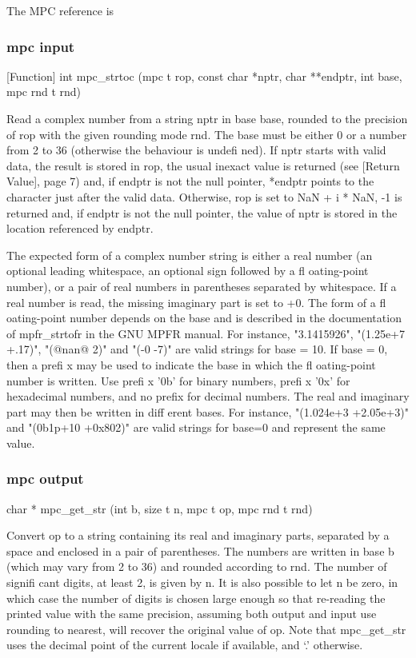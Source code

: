 The MPC reference is \cite{mpc_2012}

\lipsum[1]




\subsubsection{mpc input}
[Function] int mpc\_strtoc (mpc t rop, const char *nptr, char **endptr, int base,
mpc rnd t rnd)

Read a complex number from a string nptr in base base, rounded to the precision of rop
with the given rounding mode rnd. The base must be either 0 or a number from 2 to 36
(otherwise the behaviour is undefi ned). If nptr starts with valid data, the result is stored in
rop, the usual inexact value is returned (see [Return Value], page 7) and, if endptr is not the
null pointer, *endptr points to the character just after the valid data. Otherwise, rop is set
to NaN + i * NaN, -1 is returned and, if endptr is not the null pointer, the value of nptr is
stored in the location referenced by endptr.

The expected form of a complex number string is either a real number (an optional leading
whitespace, an optional sign followed by a fl oating-point number), or a pair of real numbers
in parentheses separated by whitespace. If a real number is read, the missing imaginary part
is set to +0. The form of a fl oating-point number depends on the base and is described in the
documentation of mpfr\_strtofr in the GNU MPFR manual. For instance, "3.1415926",
"(1.25e+7 +.17)", "(@nan@ 2)" and "(-0 -7)" are valid strings for base = 10. If base = 0,
then a prefi x may be used to indicate the base in which the fl oating-point number is written.
Use prefi x ’0b’ for binary numbers, prefi x ’0x’ for hexadecimal numbers, and no prefix for
decimal numbers. The real and imaginary part may then be written in diff erent bases. For
instance, "(1.024e+3 +2.05e+3)" and "(0b1p+10 +0x802)" are valid strings for base=0 and
represent the same value.



\subsubsection{mpc output}
char * mpc\_get\_str (int b, size t n, mpc t op, mpc rnd t rnd)

Convert op to a string containing its real and imaginary parts, separated by a space and
enclosed in a pair of parentheses. The numbers are written in base b (which may vary from 2
to 36) and rounded according to rnd. The number of signifi cant digits, at least 2, is given by
n. It is also possible to let n be zero, in which case the number of digits is chosen large enough
so that re-reading the printed value with the same precision, assuming both output and input
use rounding to nearest, will recover the original value of op. Note that mpc\_get\_str uses
the decimal point of the current locale if available, and ‘.’ otherwise.

